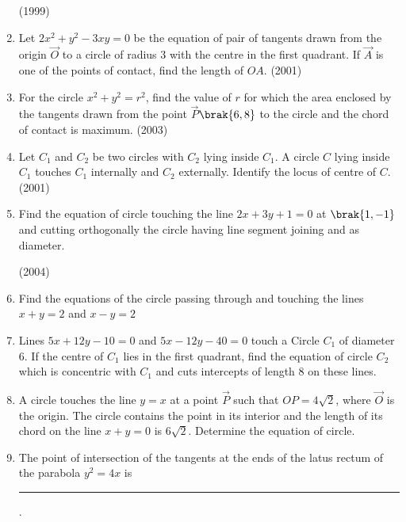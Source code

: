 \begin{enumerate}[label=\thesubsection.\arabic*.,ref=\thesubsection.\theenumi]
                  \hfill(1999)
%
%
\item Let $2x^2+y^2-3xy=0$ be the equation of pair of tangents drawn from the origin $\vec{O}$ to a circle of radius 3 with the centre in the first quadrant. If $\vec{A}$ is one of the points of contact,  find the length of $OA$.                   \hfill(2001)
%
%
%
\item For the circle $x^2+y^2=r^2$,  find the value of $r$ for which the area enclosed by the tangents drawn from the point $\vec{P}$$\brak{6, 8}$ to the circle and the chord of contact is maximum.
%
%
\hfill(2003) 
%
\item Let $C_{1}$ and $C_{2}$ be two circles with $C_{2}$ lying inside $C_{1}$. A circle $C$ lying inside $C_{1}$ touches $C_{1}$ internally and $C_{2}$ externally. Identify the locus of centre of $C$.                                \hfill(2001)
%
%
%
%
%
%
\item Find the equation of circle touching the line $2x+3y+1=0$ at $\brak{1, -1}$ and cutting orthogonally the circle having line segment joining  and  as diameter.

\hfill(2004)     
\item Find the equations of the circle passing through  and touching the lines $x+y=2$ and $x-y=2$
%
\hfill {}
\item Lines $5x+12y-10=0$ and $5x-12y-40=0$ touch a Circle $C_1$ of diameter 6. If the centre of $C_1$ lies in the first quadrant,  find the equation of circle $C_2$ which is concentric with $C_1$ and cuts intercepts of length 8 on these lines.
%
\hfill {}
\item A circle touches the line $y=x$ at a point $\vec{P}$ such that $OP=4\sqrt{2}$,  where $\vec{O}$ is the origin. The circle contains the point  in its interior and the length of its chord on the line $x+y=0$ is $6\sqrt{2}$. Determine the equation of circle.
%
\hfill {}
     \item The point of intersection of the tangents at the ends of the latus rectum of the parabola $y^2=4x$ is \rule{1cm}{0.1pt}.
    \hfill{}
    

\end{enumerate}
